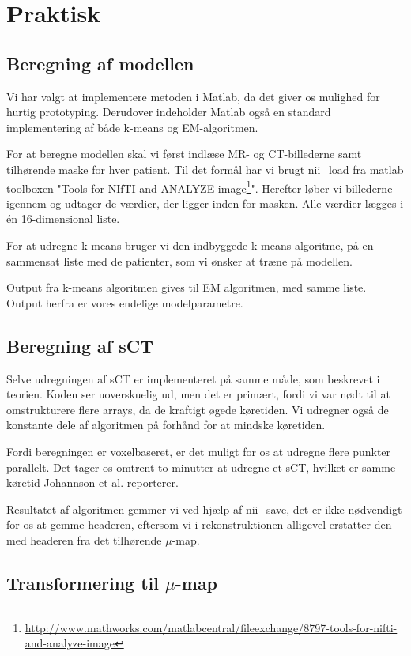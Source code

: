 \section{Praktisk}

\subsection{Beregning af modellen}

Vi har valgt at implementere metoden i Matlab, da det giver os mulighed
for hurtig prototyping. Derudover indeholder Matlab også en standard
implementering af både k-means og EM-algoritmen.

For at beregne modellen skal vi først indlæse MR- og CT-billederne
samt tilhørende maske for hver patient. Til det formål har vi brugt
nii\_load fra matlab toolboxen "Tools for NIfTI and ANALYZE
image\footnote{\url{http://www.mathworks.com/matlabcentral/fileexchange/8797-tools-for-nifti-and-analyze-image}}".
Herefter løber vi billederne igennem og udtager de værdier, der ligger
inden for masken. Alle værdier lægges i én 16-dimensional liste.

For at udregne k-means bruger vi den indbyggede k-means algoritme, på
en sammensat liste med de patienter, som vi ønsker at træne på
modellen.

Output fra k-means algoritmen gives til EM algoritmen, med samme liste. Output herfra er vores endelige modelparametre.

\subsection{Beregning af sCT}

Selve udregningen af sCT er implementeret på samme måde, som beskrevet i
teorien. Koden ser uoverskuelig ud, men det er primært, fordi
vi var nødt til at omstrukturere flere arrays, da de kraftigt øgede køretiden. Vi udregner også de konstante dele
af algoritmen på forhånd for at mindske køretiden.

Fordi beregningen er voxelbaseret, er det muligt for os at udregne flere
punkter parallelt. Det tager os omtrent to minutter at udregne et sCT,
hvilket er samme køretid Johannson et al. reporterer.

Resultatet af algoritmen gemmer vi ved hjælp af nii\_save, det er ikke
nødvendigt for os at gemme headeren, eftersom vi i rekonstruktionen
alligevel erstatter den med headeren fra det tilhørende $\mu$-map.

\subsection{Transformering til \texorpdfstring{$\mu$}{u}-map} 

